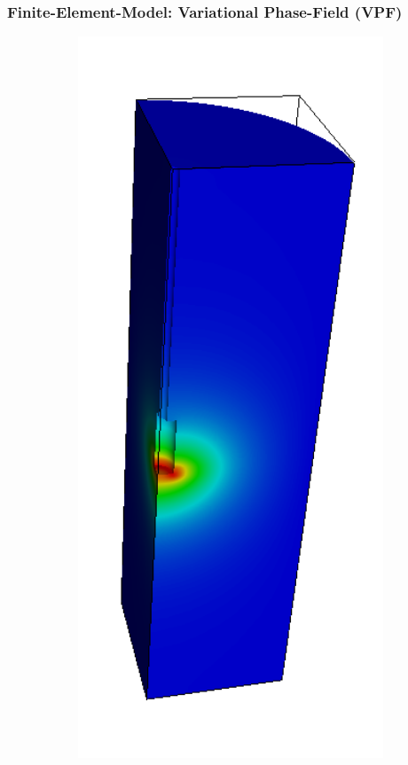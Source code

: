 
\subsubsection*{Finite-Element-Model: Variational Phase-Field (VPF)}

\begin{figure}[!ht]
\begin{subfigure}[c]{0.49\textwidth}
\includegraphics[width=1\textwidth]{figures/ME3_pres.png}

\end{subfigure}
\end{figure}

